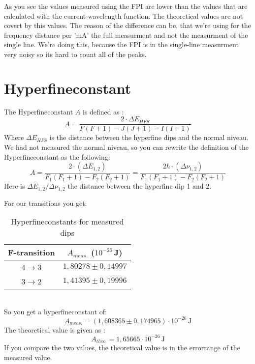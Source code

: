 As you see the values measured using the FPI are lower than the values that are calculated with the current-wavelength function.
The theoretical values are not covert by this values.
The reason of the difference can be, that we're using for the frequency distance per 'mA' the full measurment and not the measurment of the single line.
We're doing this, because the FPI is in the single-line measurment very noisy so its hard to count all of the peaks.
\newpage
\section{Hyperfineconstant}
The Hyperfineconstant $A$ is defined as \citep[][]{Kohler}:
\begin{equation}
    A = \frac{2\cdot\Delta E_{HFS}}{F(F+1)-J(J+1)-I(I+1)}
\end{equation}
Where $\Delta E_{HFS}$ is the distance between the hyperfine dips and the normal niveau.\\
We had not measured the normal niveau, so you can rewrite the definition of the Hyperfineconstant as the following:
\begin{equation}
    A = \frac{2\cdot\left(\Delta E_{1,2}\right)}{F_1(F_1+1)-F_2(F_2+1)}=\frac{2h\cdot\left(\Delta \nu_{1,2}\right)}{F_1(F_1+1)-F_2(F_2+1)}
\end{equation}
Here is $\Delta E_{1,2}/\Delta\nu_{1,2}$ the distance between the hyperfine dip 1 and 2.

For our transitions you get:
\begin{table}[h]
    \centering\begin{tabular}{c|c}
        F-transition&$A_{meas.}$ ($10^{-26}\,$J)\\\hline
        4$\to$3 &$1,80278\pm0,14997$\\
        3$\to$2 &$1,41395\pm0,19996$\\
    \end{tabular}
    \caption{Hyperfineconstants for measured dips}
\end{table}\\
So you get a hyperfineconstant of:
\begin{equation}
    A_{meas.}=\left(1,608365\pm0,174965\right)\cdot10^{-26}\,\text{J}
\end{equation}
The theoretical value is given as \citep[][]{AnhangA}:
\begin{equation}
    A_{theo.}=1,65665\cdot10^{-26}\,\text{J}
\end{equation}
If you compare the two values, the theoretical value is in the errorrange of the measured value.\newpage
